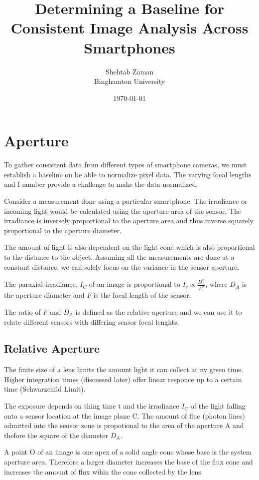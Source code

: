\documentclass{article}
\title{Determining a Baseline for Consistent Image Analysis Across Smartphones}
\author{Shehtab Zaman \\ Binghamton University}
\date{\today}
\begin{document}
\maketitle
\section{Aperture}

To gather consistent data from different types of smartphone cameras, we must establish
a baseline on be able to normalize pixel data. The varying focal lengths and
f-number provide a challenge to make the data normalized.

Consider a measurement done using a particular smartphone. The irradiance
or incoming light would be calculated using the aperture area of the sensor.
The irradiance is inversely proportional to the aperture area and thus inverse
squarely proportional to the aperture diameter.

The amount of light is also dependent on the light cone which is also
proportional to the distance to the object. Assuming all the measurements are
done at a constant distance, we can solely focus on the variance in the
sensor aperture.

The paraxial irradiance, $ I_C$ of an image is proportional to $I_c \propto \frac{D^2_A}{F^2} $,
where $ D_A$ is the aperture diameter and $ F$ is the focal length of the sensor.

The ratio of $ F$ and $ D_A$ is defined as the relative aperture and we can use it
to relate different sensors with differing sensor focal lenghts.

\subsection{Relative Aperture}

The finite size of a lens limits the amount light it can collect at ny given time.
Higher integration times (discussed later) offer linear responce up to a certain
time (Schwarzchild Limit).

The exposure depends on thing time t and the irradiance $ I_C$
of the light falling onto a sensor location at the image plane C.
The amount of fluc (photon lines) admitted into the sensor zone is propotional
to the area of the aperture A and thefore the square of the diameter $ D_A$.

A point O of an image is one apex
of a solid angle cone whose base is the system aperture area. Therefore a larger
diameter increases the base of the flux cone and increases the amount of flux wihin the cone
collected by the lens.
\end{document}
